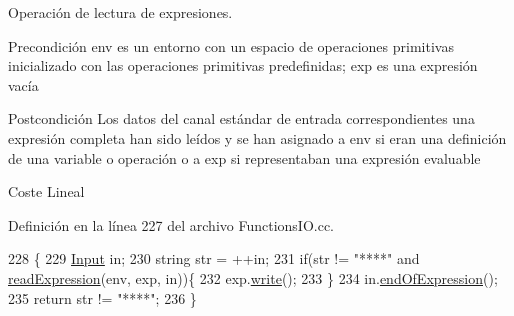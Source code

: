 Operación de lectura de expresiones. 

\begin{DoxyPrecond}{Precondición}
\textquotesingle{}env\textquotesingle{} es un entorno con un espacio de operaciones primitivas inicializado con las operaciones primitivas predefinidas; \textquotesingle{}exp\textquotesingle{} es una expresión vacía 
\end{DoxyPrecond}
\begin{DoxyPostcond}{Postcondición}
Los datos del canal estándar de entrada correspondientes una expresión completa han sido leídos y se han asignado a \textquotesingle{}env\textquotesingle{} si eran una definición de una variable o operación o a \textquotesingle{}exp\textquotesingle{} si representaban una expresión evaluable 
\end{DoxyPostcond}
\begin{DoxyParagraph}{Coste}
Lineal 
\end{DoxyParagraph}


Definición en la línea 227 del archivo Functions\+I\+O.\+cc.


\begin{DoxyCode}
228 \{
229   \hyperlink{class_input}{Input} in;
230   \textcolor{keywordtype}{string} str = ++in;
231   \textcolor{keywordflow}{if}(str != \textcolor{stringliteral}{"****"} and \hyperlink{_functions_i_o_8cc_a0c2a0ba0f4fe2dfe26ec14053ce4d408}{readExpression}(env, exp, in))\{
232     exp.\hyperlink{class_expression_a6d5d0fa496e3713c332c9f1edc269de5}{write}();
233   \}
234   in.\hyperlink{class_input_a326f5a9c81353747b9f525bb32dbc8df}{endOfExpression}();
235   \textcolor{keywordflow}{return} str != \textcolor{stringliteral}{"****"};
236 \}
\end{DoxyCode}
